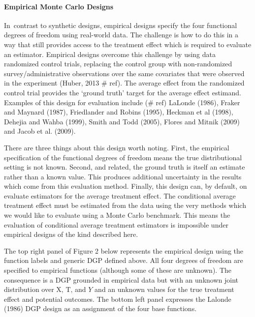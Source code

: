 \documentclass[../main.tex]{subfiles}
\begin{document}
\vspace{\baselineskip}
\paragraph*{Empirical Monte Carlo Designs}\par


\vspace{\baselineskip}
In\ contrast to synthetic designs, empirical designs specify the four functional degrees of freedom using real-world data. The challenge is how to do this in a way that still provides access to the treatment effect which is required to evaluate an estimator. Empirical designs overcome this challenge by using data randomized control trials, replacing the control group with non-randomized survey/administrative observations over the same covariates that were observed in the experiment (Huber, 2013 $\#$ ref). The average effect from the randomized control trial provides the ‘ground truth’ target for the average effect estimand. Examples of this design for evaluation include ($\#$ ref) LaLonde (1986), Fraker and Maynard (1987), Friedlander and Robins (1995), Heckman et al (1998), Dehejia and Wahba (1999), Smith and Todd (2005),  Flores and Mitnik (2009) and Jacob et al. (2009).\par


\vspace{\baselineskip}
There are three things about this design worth noting. First, the empirical specification of the functional degrees of freedom means the true distributional setting is not known. Second, and related, the ground truth is itself an estimate rather than a known value. This produces additional uncertainty in the results which come from this evaluation method. Finally, this design can, by default, on evaluate estimators for the average treatment effect. The conditional average treatment effect must be estimated from the data using the very methods which we would like to evaluate using a Monte Carlo benchmark. This means the evaluation of conditional average treatment estimators is impossible under empirical designs of the kind described here.\par


\vspace{\baselineskip}
The top right panel of Figure 2 below represents the empirical design using the function labels and generic DGP defined above. All four degrees of freedom are specified to empirical functions (although some of these are unknown). The consequence is a DGP grounded in empirical data but with an unknown joint distribution over  \( \text{X, T,} \) and  \( Y \) and an unknown values for the true treatment effect and potential outcomes. The bottom left panel expresses the Lalonde (1986) DGP design as an assignment of the four base functions.\par
\end{document}
